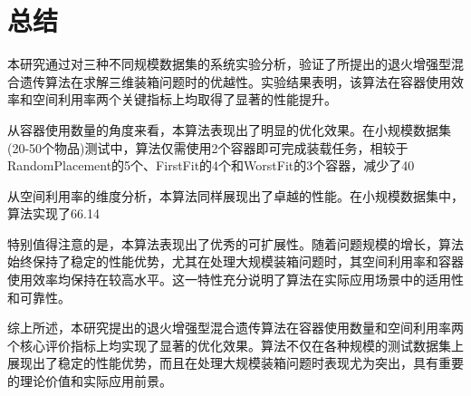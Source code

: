 \documentclass[UTF8]{ctexart}
\begin{document}
\section{总结}

本研究通过对三种不同规模数据集的系统实验分析，验证了所提出的退火增强型混合遗传算法在求解三维装箱问题时的优越性。实验结果表明，该算法在容器使用效率和空间利用率两个关键指标上均取得了显著的性能提升。

从容器使用数量的角度来看，本算法表现出了明显的优化效果。在小规模数据集(20-50个物品)测试中，算法仅需使用2个容器即可完成装载任务，相较于RandomPlacement的5个、FirstFit的4个和WorstFit的3个容器，减少了40%

从空间利用率的维度分析，本算法同样展现出了卓越的性能。在小规模数据集中，算法实现了66.14%

特别值得注意的是，本算法表现出了优秀的可扩展性。随着问题规模的增长，算法始终保持了稳定的性能优势，尤其在处理大规模装箱问题时，其空间利用率和容器使用效率均保持在较高水平。这一特性充分说明了算法在实际应用场景中的适用性和可靠性。

综上所述，本研究提出的退火增强型混合遗传算法在容器使用数量和空间利用率两个核心评价指标上均实现了显著的优化效果。算法不仅在各种规模的测试数据集上展现出了稳定的性能优势，而且在处理大规模装箱问题时表现尤为突出，具有重要的理论价值和实际应用前景。
\end{document}
